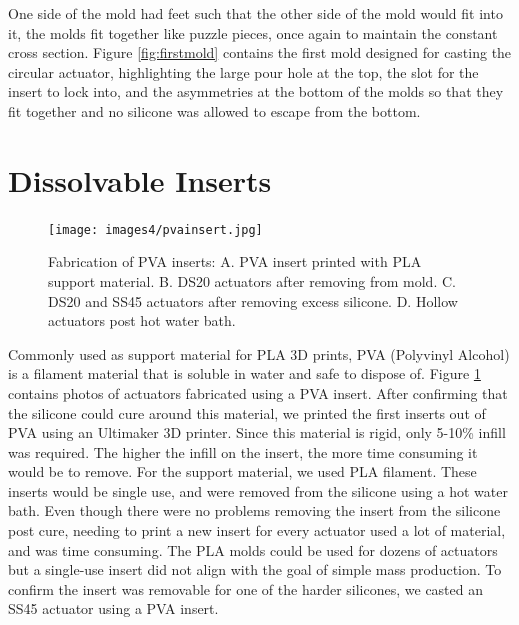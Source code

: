 One side of the mold had feet such that the other side of the mold would fit into it, the molds fit together like puzzle pieces, once again to maintain the constant cross section. Figure \ref{fig:firstmold} contains the first mold designed for casting the circular actuator, highlighting the large pour hole at the top, the slot for the insert to lock into, and the asymmetries at the bottom of the molds so that they fit together and no silicone was allowed to escape from the bottom. 

\section{Dissolvable Inserts}

\begin{figure}[h]
    \centering
    \texttt{[image: images4/pvainsert.jpg]}
    \caption{Fabrication of PVA inserts: A. PVA insert printed with PLA support material. B. DS20 actuators after removing from mold. C. DS20 and SS45 actuators after removing excess silicone. D. Hollow actuators post hot water bath.}
    \label{fig:pvainsert}
\end{figure}

Commonly used as support material for PLA 3D prints, PVA (Polyvinyl Alcohol) is a filament material that is soluble in water and safe to dispose of. Figure \ref{fig:pvainsert} contains photos of actuators fabricated using a PVA insert.  After confirming that the silicone could cure around this material, we printed the first inserts out of PVA using an Ultimaker 3D printer. Since this material is rigid, only 5-10\% infill was required. The higher the infill on the insert, the more time consuming it would be to remove. For the support material, we used PLA filament. These inserts would be single use, and were removed from the silicone using a hot water bath. Even though there were no problems removing the insert from the silicone post cure, needing to print a new insert for every actuator used a lot of material, and was time consuming. The PLA molds could be used for dozens of actuators but a single-use insert did not align with the goal of simple mass production. To confirm the insert was removable for one of the harder silicones, we casted an SS45 actuator using a PVA insert.  

